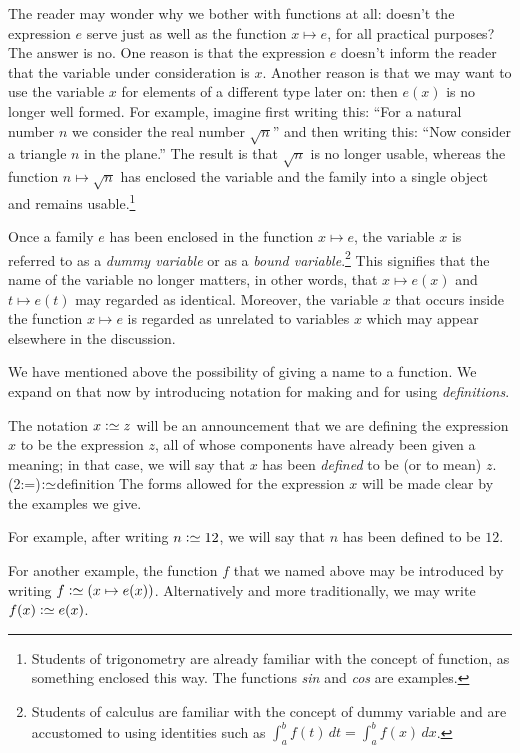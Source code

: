The reader may wonder why we bother with functions at all: doesn't the expression $e$ serve just as well as the function $x \mapsto e$, for all
practical purposes?  The answer is no.  One reason is that the expression $e$ doesn't inform the reader that the variable under consideration is
$x$.  Another reason is that we may want to use the variable $x$ for elements of a different type later on: then $e(x)$ is no longer well
formed.  For example, imagine first writing this: ``For a natural number $n$ we consider the real number $\sqrt n$'' and then writing this:
``Now consider a triangle $n$ in the plane.''  The result is that $\sqrt n$ is no longer usable, whereas the function $n \mapsto \sqrt n$ has
enclosed the variable and the family into a single object and remains usable.\footnote{Students of trigonometry are already familiar with the
concept of function, as something enclosed this way.  The functions \emph{sin} and \emph{cos} are examples.}

Once a family $e$ has been enclosed in the function $x \mapsto e$, the variable $x$ is referred to as a \emph{dummy variable} or as a \emph{bound variable}.\footnote{Students of calculus are familiar with the concept of dummy variable
and are accustomed to using identities such as $\int_a^b f(t)\,dt = \int_a^b f(x)\,dx$.} This signifies that the name of the variable no longer
matters, in other words, that $x \mapsto e(x)$ and $t \mapsto e(t)$ may regarded as identical.  Moreover, the variable $x$ that occurs inside
the function $x \mapsto e$ is regarded as unrelated to variables $x$ which may appear elsewhere in the discussion.

We have mentioned above the possibility of giving a name to a function.
We expand on that now by introducing notation for making and for using \emph{definitions}.

The notation $x \defeq z$ will be an announcement that we are defining
the expression $x$ to be the expression $z$, all of whose components have already been given a meaning;
in that case, we will say that $x$ has been \emph{defined} to be (or to mean) $z$.%
\glossary(2:=){$\defeq$}{definition}
The forms allowed for the expression $x$ will be made clear by the examples we give.

For example, after writing $n \defeq 12$, we will say that $n$ has been defined to be $12$.

For another example, the function $f$ that we named above may be introduced by writing $f \defeq ( x \mapsto e(x) )$.
Alternatively and more traditionally, we may write $f(x) \defeq e(x)$.

